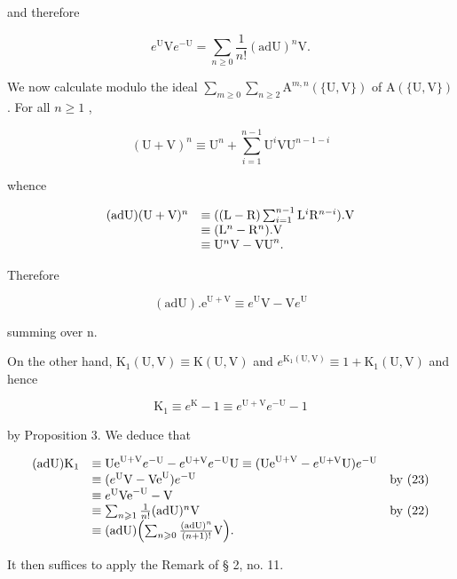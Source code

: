 and therefore

\[
e ^ {\mathrm{U}} \mathrm{V} e ^ {- \mathrm{U}} = \sum_ {n \geqslant 0} \frac {1}{n !} (\mathrm{adU}) ^ {n} \mathrm{V}.\tag{22}
\]

We now calculate modulo the ideal \(\sum_{m\geqslant 0}\sum_{n\geqslant 2}\mathrm{A}^{m,n}(\{\mathrm{U},\mathrm{V}\})\) of \(\mathrm{A}(\{\mathrm{U},\mathrm{V}\})\) . For all \(n\geqslant 1\) ,

\[
(\mathrm{U} + \mathrm{V}) ^ {n} \equiv \mathrm{U} ^ {n} + \sum_ {i = 1} ^ {n - 1} \mathrm{U} ^ {i} \mathrm{V} \mathrm{U} ^ {n - 1 - i}
\]

whence

\[
\begin{array}{r l} (\mathrm{adU}) (\mathrm{U} + \mathrm{V}) ^ {n} & \equiv ((\mathrm{L} - \mathrm{R}) \sum_ {i = 1} ^ {n - 1} \mathrm{L} ^ {i} \mathrm{R} ^ {n - i}). \mathrm{V} \\ & \equiv (\mathrm{L} ^ {n} - \mathrm{R} ^ {n}). \mathrm{V} \\ & \equiv \mathrm{U} ^ {n} \mathrm{V} - \mathrm{VU} ^ {n}. \end{array}
\]

Therefore

\[
(\mathrm{ad} \mathrm{U}). \mathrm{e} ^ {\mathrm{U} + \mathrm{V}} \equiv e ^ {\mathrm{U}} \mathrm{V} - \mathrm{V} e ^ {\mathrm{U}}\tag{23}
\]

summing over n.

On the other hand, \(\mathrm{K}_1(\mathrm{U},\mathrm{V})\equiv \mathrm{K}(\mathrm{U},\mathrm{V})\) and \(e^{\mathrm{K}_1(\mathrm{U},\mathrm{V})}\equiv 1 + \mathrm{K}_1(\mathrm{U},\mathrm{V})\) and hence

\[
\mathrm{K} _ {1} \equiv e ^ {\mathrm{K}} - 1 \equiv e ^ {\mathrm{U} + \mathrm{V}} e ^ {- \mathrm{U}} - 1
\]

by Proposition 3. We deduce that

\[
\begin{array}{r l r} (\mathrm{adU}) \mathrm{K} _ {1} & \equiv \mathrm{Ue} ^ {\mathrm{U} + \mathrm{V}} e ^ {- \mathrm{U}} - e ^ {\mathrm{U} + \mathrm{V}} e ^ {- \mathrm{U}} \mathrm{U} \equiv (\mathrm{Ue} ^ {\mathrm{U} + \mathrm{V}} - e ^ {\mathrm{U} + \mathrm{V}} \mathrm{U}) e ^ {- \mathrm{U}} \\ & \equiv (e ^ {\mathrm{U}} \mathrm{V} - \mathrm{Ve} ^ {\mathrm{U}}) e ^ {- \mathrm{U}} & \text {by (23)} \\ & \equiv e ^ {\mathrm{U}} \mathrm{Ve} ^ {- \mathrm{U}} - \mathrm{V} \\ & \equiv \sum_ {n \geqslant 1} \frac {1}{n !} (\mathrm{adU}) ^ {n} \mathrm{V} & \text {by (22)} \\ & \equiv (\mathrm{adU}) \Bigl (\sum_ {n \geqslant 0} \frac {(\mathrm{adU}) ^ {n}}{(n + 1) !} \mathrm{V} \Bigr). \end{array}
\]

It then suffices to apply the Remark of § 2, no. 11.

